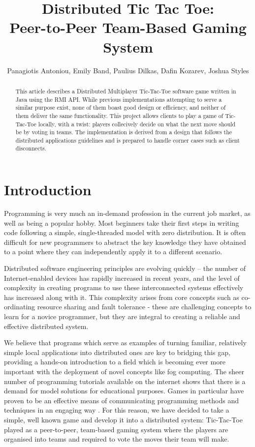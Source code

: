 \documentclass[conference]{IEEEtran}
\begin{document}
\title{Distributed Tic Tac Toe:\\ Peer-to-Peer Team-Based Gaming System}

\author{Panagiotis Antoniou, Emily Band, Paulius Dilkas, Dafin Kozarev, Joshua Styles}
\maketitle

\begin{abstract}
This article describes a Distributed Multiplayer Tic-Tac-Toe software game written in Java using the RMI API. While previous implementations attempting to serve a similar purpose exist, none of them boast good design or efficiency, and neither of them deliver the same functionality. This project allows clients to play a game of Tic-Tac-Toe locally, with a twist: players collecively decide on what the next move should be by voting in teams. The implementation is derived from a design that follows the distributed applications guidelines and is prepared to handle corner cases such as client disconnects.
\end{abstract}

\section{Introduction}
Programming is very much an in-demand profession in the current job market, as well as being a popular hobby. Most beginners take their first steps in writing code
following a simple, single-threaded model with zero distribution. It is often difficult for new programmers to abstract the key knowledge they have obtained to a point where they can independently apply it to a different scenario.

Distributed software engineering principles are evolving quickly – the number of Internet-enabled devices has rapidly increased in recent years, and the level of complexity in creating programs to use these interconnected systems effectively has increased along with it. This complexity arises from core concepts such as co-ordinating resource sharing and fault tolerance - these are challenging concepts to learn for a novice programmer, but they are integral to creating a reliable and effective distributed system. 

We believe that programs which serve as examples of turning familiar, relatively simple local applications into distributed ones are key to bridging this gap, providing a hands-on introduction to a field which is becoming ever more important with the deployment of novel concepts like fog computing. The sheer number of programming tutorials available on the internet shows that there is a demand for model solutions for educational purposes. Games in particular have proven to be an effective means of communicating programming methods and techniques in an engaging way \cite{Kiniry:2011:VG:1984674.1984681}. For this reason, we have decided to take a simple, well known game and develop it into a distributed system: Tic-Tac-Toe played as a peer-to-peer, team-based gaming system where the players are organised into teams and required to vote the moves their team will make.
\end{document}
